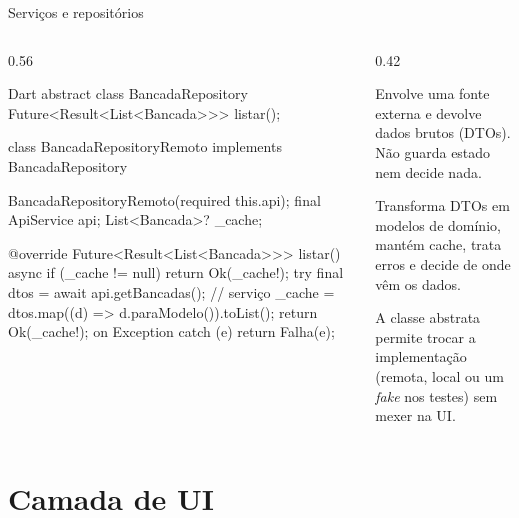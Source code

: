 \documentclass[aspectratio=169,10pt]{beamer}
\begin{document}
\begin{frame}[fragile]{Serviços e repositórios}
  \begin{columns}[T]
    \begin{column}{0.56\textwidth}
\begin{codigo}[title=data/repositories/bancada\_repository.dart]{Dart}
abstract class BancadaRepository {
  Future<Result<List<Bancada>>> listar();
}

class BancadaRepositoryRemoto implements BancadaRepository {
  BancadaRepositoryRemoto({required this.api});
  final ApiService api;
  List<Bancada>? _cache;

  @override
  Future<Result<List<Bancada>>> listar() async {
    if (_cache != null) return Ok(_cache!);
    try {
      final dtos = await api.getBancadas();   // serviço
      _cache = dtos.map((d) => d.paraModelo()).toList();
      return Ok(_cache!);
    } on Exception catch (e) { return Falha(e); }
  }
}
\end{codigo}
    \end{column}
    \begin{column}{0.42\textwidth}
      \begin{conceito}[Serviço]
        Envolve uma fonte externa e devolve dados brutos (DTOs). Não guarda estado nem decide nada.
      \end{conceito}
      \begin{conceito}[Repositório]
        Transforma DTOs em modelos de domínio, mantém cache, trata erros e decide de onde vêm os dados.
      \end{conceito}
      \begin{dica}
        A classe abstrata permite trocar a implementação (remota, local ou um \emph{fake} nos testes) sem mexer na UI.
      \end{dica}
    \end{column}
  \end{columns}
\end{frame}

\section{Camada de UI}
\end{document}
